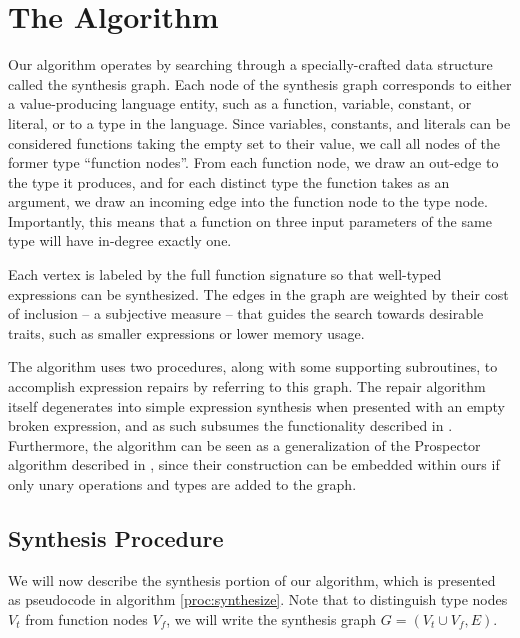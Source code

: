 \section{The Algorithm}
\label{sec:algorithm}

Our algorithm operates by searching through a specially-crafted data structure called the synthesis graph. Each node of the synthesis graph corresponds to either a value-producing language entity, such as a function, variable, constant, or literal, or to a type in the language. Since variables, constants, and literals can be considered functions taking the empty set to their value, we call all nodes of the former type ``function nodes''. From each function node, we draw an out-edge to the type it produces, and for each distinct type the function takes as an argument, we draw an incoming edge into the function node to the type node. Importantly, this means that a function on three input parameters of the same type will have in-degree exactly one.

Each vertex is labeled by the full function signature so that well-typed expressions can be synthesized. The edges in the graph are weighted by their cost of inclusion -- a subjective measure -- that guides the search towards desirable traits, such as smaller expressions or lower memory usage.

The algorithm uses two procedures, along with some supporting subroutines, to accomplish expression repairs by referring to this graph. The repair algorithm itself degenerates into simple expression synthesis when presented with an empty broken expression, and as such subsumes the functionality described in \cite{GveroETAL13CompleteCompletionTypesWeights}. Furthermore, the algorithm can be seen as a generalization of the Prospector algorithm described in \cite{MandelinetALL2005Jungloid}, since their construction can be embedded within ours if only unary operations and types are added to the graph.

\subsection{Synthesis Procedure}
We will now describe the synthesis portion of our algorithm, which is presented as pseudocode in algorithm \ref{proc:synthesize}. Note that to distinguish type nodes $V_t$ from function nodes $V_f$, we will write the synthesis graph $G=(V_t \cup V_f, E)$.

